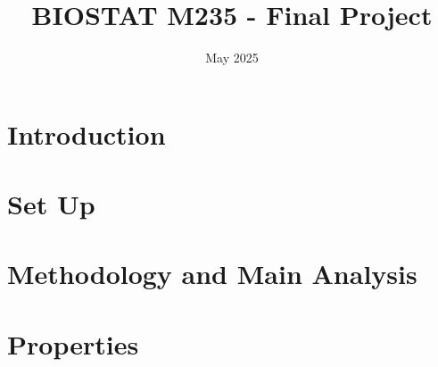 \documentclass[12pt]{article}
\title{BIOSTAT M235 - Final Project}
\author{}
\date{May 2025}
\begin{document}
\doublespacing


\maketitle

\section{Introduction}

\section{Set Up}

\section{Methodology and Main Analysis}

\section{Properties}
\end{document}

